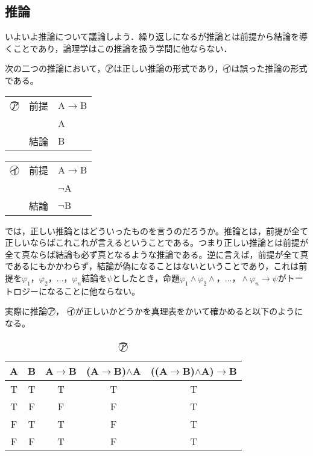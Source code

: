 \documentclass[10pt,b5paper,papersize,dvipdfmx]{jsbook}
\begin{document}
\subsection{推論}
いよいよ推論について議論しよう．繰り返しになるが推論とは前提から結論を導くことであり，論理学はこの推論を扱う学問に他ならない．\par
次の二つの推論において，\textcircled{\scriptsize ア}は正しい推論の形式であり，\textcircled{\scriptsize イ}は誤った推論の形式である。
\begin{table}[H]
\begin{minipage}[t]{.45\textwidth}
\begin{center}
\begin{tabular}{lll}
\textcircled{\scriptsize ア}&前提&A$\to$B \\
&&A \\ \hline
&結論&B \\
\end{tabular}
\end{center}
\end{minipage}
\hfill
\begin{minipage}[t]{.45\textwidth}
\begin{center}
\begin{tabular}{lll}
\textcircled{\scriptsize イ}&前提&A$\to$B \\
&&$\lnot$A \\ \hline
&結論&$\lnot$B \\
\end{tabular}
\end{center}
\end{minipage}
\end{table}
では，正しい推論とはどういったものを言うのだろうか。推論とは，前提が全て正しいならばこれこれが言えるということである。つまり正しい推論とは前提が全て真ならば結論も必ず真となるような推論である。逆に言えば，前提が全て真であるにもかかわらず，結論が偽になることはないということであり，これは前提を$\varphi_1，\varphi_2，\dots，\varphi_n$結論を$\psi$としたとき，命題$\varphi_1\land\varphi_2\land，\dots，\land\varphi_n\to\psi$がトートロジーになることに他ならない。\par
実際に推論\textcircled{\scriptsize ア}， \textcircled{\scriptsize イ}が正しいかどうかを真理表をかいて確かめると以下のようになる。
\begin{table}[H]
\begin{center}
\caption{\textcircled{\scriptsize ア}}
\begin{tabular}{|c|c||c|c|c|}\hline
A&B&A$\to$B&(A$\to$B)$\land$A&((A$\to$B)$\land$A)$\to$B \\ \hline \hline
T&T&T&T&T \\ \hline
T&F&F&F&T \\ \hline
F&T&T&F&T \\ \hline
F&F&T&F&T \\ \hline
\end{tabular}
\end{center}
\end{table}
\end{document}
